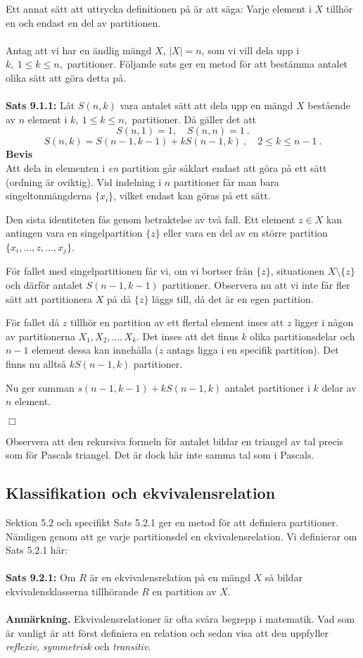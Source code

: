 \documentclass{article}
\begin{document}
Ett annat sätt att uttrycka definitionen på är att säga: Varje element i $X$ tillhör en och endast en del av partitionen.\\ \\
Antag att vi har en ändlig mängd $X$, $|X|=n$, som vi vill dela upp i $k, \ 1\leq k\leq n,$ partitioner. Följande sats ger en metod för att bestämma antalet olika sätt att göra detta på.\\ \\
\textbf{Sats 9.1.1:} Låt $S(n,k)$ vara antalet sätt att dela upp en mängd $X$ bestående av $n$ element i $k, \ 1\leq k\leq n,$ partitioner. Då gäller det att
$$
S(n,1)=1, \quad S(n,n)=1 \ .
$$
$$
S(n,k)=S(n-1,k-1)+kS(n-1,k) \ , \quad  2\leq k\leq n-1 \ .
$$
\textbf{Bevis}\\
Att dela in elementen i \textit{en} partition går såklart endast att göra på ett sätt (ordning är oviktig). Vid indelning i $n$ partitioner får man bara singeltonmängderna $\{x_i\}$, vilket endast kan göras på ett sätt.

Den sista identiteten fås genom betraktelse av två fall. Ett element $z\in X$ kan antingen vara en singelpartition $\{z\}$ eller vara en del av en större partition $\{x_i,...,z,...,x_j\}$. 

För fallet med singelpartitionen får vi, om vi bortser från $\{z\}$, situationen $X\setminus\{z\}$ och därför antalet $S(n-1,k-1)$ partitioner. Observera nu att vi inte får fler sätt att partitionera $X$ på då $\{z\}$ läggs till, då det är en egen partition.

För fallet då $z$ tillhör en partition av ett flertal element inses att $z$ ligger i någon av partitionerna $X_1,X_2,...,X_k$. Det inses att det finns $k$ olika partitionsdelar och $n-1$ element dessa kan innehålla ($z$ antags ligga i en specifik partition). Det finns nu alltså $kS(n-1,k)$ partitioner.

Nu ger summan $s(n-1,k-1)+kS(n-1,k)$  antalet partitioner i $k$ delar av $n$ element. 
\begin{flushright}
$\Box$
\end{flushright}
Observera att den rekursiva formeln för antalet bildar en triangel av tal precis som för Pascals triangel. Det är dock här inte samma tal som i Pascals.

\subsection{Klassifikation och ekvivalensrelation}
Sektion 5.2 och specifikt Sats 5.2.1 ger en metod för att definiera partitioner. Nämligen genom att ge varje partitionsdel en ekvivalensrelation. Vi definierar om Sats 5.2.1 här:\\ \\
\textbf{Sats 9.2.1:} Om $R$ är en ekvivalensrelation på en mängd $X$ så bildar ekvivalensklasserna tillhörande $R$ en partition av $X$.\\ \\
\textbf{Anmärkning.} Ekvivalensrelationer är ofta svåra begrepp i matematik. Vad som är vanligt är att först definiera en relation och sedan visa att den uppfyller \textit{reflexiv, symmetrisk} och \textit{transitiv}.
\end{document}
